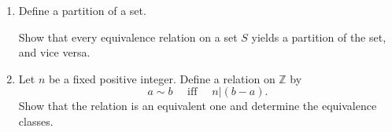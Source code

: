 \documentclass{article}
\begin{document}
\begin{enumerate}
\item Define a partition of a set. 

Show that every equivalence relation on a set $S$ yields a partition of the set, and vice versa.
\item Let $n$ be a fixed positive integer. Define a relation on $\mathbb Z$ by \[a\sim b \quad\text{ iff }\quad n\vert(b-a).\] Show that the relation is an equivalent one and determine the equivalence classes.
\end{enumerate}
\end{document}

